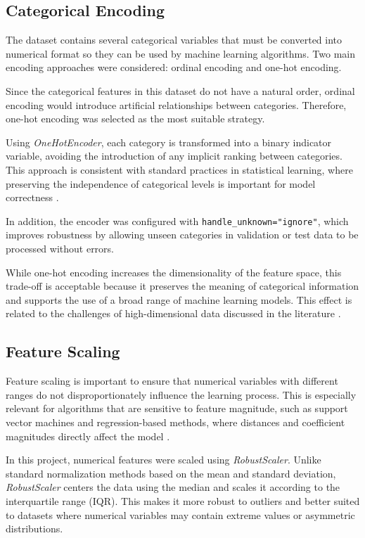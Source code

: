 \subsection{Categorical Encoding}

The dataset contains several categorical variables that must be converted into numerical format so they can be used by machine learning algorithms. Two main encoding approaches were considered: ordinal encoding and one-hot encoding.

Since the categorical features in this dataset do not have a natural order, ordinal encoding would introduce artificial relationships between categories. Therefore, one-hot encoding was selected as the most suitable strategy.

Using \textit{OneHotEncoder}, each category is transformed into a binary indicator variable, avoiding the introduction of any implicit ranking between categories. This approach is consistent with standard practices in statistical learning, where preserving the independence of categorical levels is important for model correctness \cite{hastie2009overview}.

In addition, the encoder was configured with \texttt{handle\_unknown="ignore"}, which improves robustness by allowing unseen categories in validation or test data to be processed without errors.

While one-hot encoding increases the dimensionality of the feature space, this trade-off is acceptable because it preserves the meaning of categorical information and supports the use of a broad range of machine learning models. This effect is related to the challenges of high-dimensional data discussed in the literature \cite{hastie2009high_dimensional}.

\subsection{Feature Scaling}

Feature scaling is important to ensure that numerical variables with different ranges do not disproportionately influence the learning process. This is especially relevant for algorithms that are sensitive to feature magnitude, such as support vector machines and regression-based methods, where distances and coefficient magnitudes directly affect the model \cite{hastie2009linear_regression}.

In this project, numerical features were scaled using \textit{RobustScaler}. Unlike standard normalization methods based on the mean and standard deviation, \textit{RobustScaler} centers the data using the median and scales it according to the interquartile range (IQR). This makes it more robust to outliers and better suited to datasets where numerical variables may contain extreme values or asymmetric distributions.

